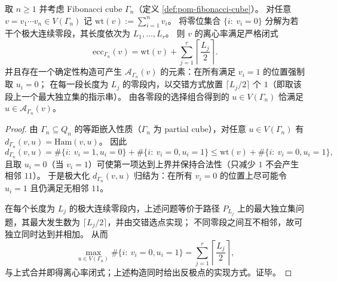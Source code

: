 \begin{theorem}\label{thm:pom-fibcube-eccentricity-closed-form}
取 \(n\ge 1\) 并考虑 Fibonacci cube \(\Gamma_n\)（定义 \ref{def:pom-fibonacci-cube}）。
对任意 \(v=v_1\cdots v_n\in V(\Gamma_n)\) 记 \(\mathrm{wt}(v):=\sum_{i=1}^n v_i\)。
将零位集合 \(\{i:\ v_i=0\}\) 分解为若干个极大连续零段，其长度依次为 \(L_1,\dots,L_r\)。
则 \(v\) 的离心率满足严格闭式
\[
\mathrm{ecc}_{\Gamma_n}(v)=\mathrm{wt}(v)+\sum_{j=1}^{r}\left\lceil\frac{L_j}{2}\right\rceil.
\]
并且存在一个确定性构造可产生 \(\mathcal{A}_{\Gamma_n}(v)\) 的元素：在所有满足 \(v_i=1\) 的位置强制取 \(u_i=0\)；
在每一段长度为 \(L_j\) 的零段内，以交错方式放置 \(\lceil L_j/2\rceil\) 个 \(1\)（即取该段上一个最大独立集的指示串）。
由各零段的选择组合得到的 \(u\in V(\Gamma_n)\) 恰满足 \(u\in\mathcal{A}_{\Gamma_n}(v)\)。
\end{theorem}
\begin{proof}
由 \(\Gamma_n\subseteq Q_n\) 的等距嵌入性质（\(\Gamma_n\) 为 partial cube），对任意 \(u\in V(\Gamma_n)\) 有
\(
d_{\Gamma_n}(v,u)=\mathrm{Ham}(v,u)
\)。
因此
\[
d_{\Gamma_n}(v,u)=\#\{i:\ v_i=1,u_i=0\}+\#\{i:\ v_i=0,u_i=1\}
\le \mathrm{wt}(v)+\#\{i:\ v_i=0,u_i=1\},
\]
且取 \(u_i=0\)（当 \(v_i=1\)）可使第一项达到上界并保持合法性（只减少 \(1\) 不会产生相邻 \(11\)）。
于是极大化 \(d_{\Gamma_n}(v,u)\) 归结为：在所有 \(v_i=0\) 的位置上尽可能令 \(u_i=1\) 且仍满足无相邻 \(11\)。
\par
在每个长度为 \(L_j\) 的极大连续零段内，上述问题等价于路径 \(P_{L_j}\) 上的最大独立集问题，其最大发生数为 \(\lceil L_j/2\rceil\)，并由交错选点实现；
不同零段之间互不相邻，故可独立同时达到并相加。
从而
\[
\max_{u\in V(\Gamma_n)}\#\{i:\ v_i=0,u_i=1\}
=\sum_{j=1}^{r}\left\lceil\frac{L_j}{2}\right\rceil,
\]
与上式合并即得离心率闭式；上述构造同时给出反极点的实现方式。证毕。
\end{proof}

